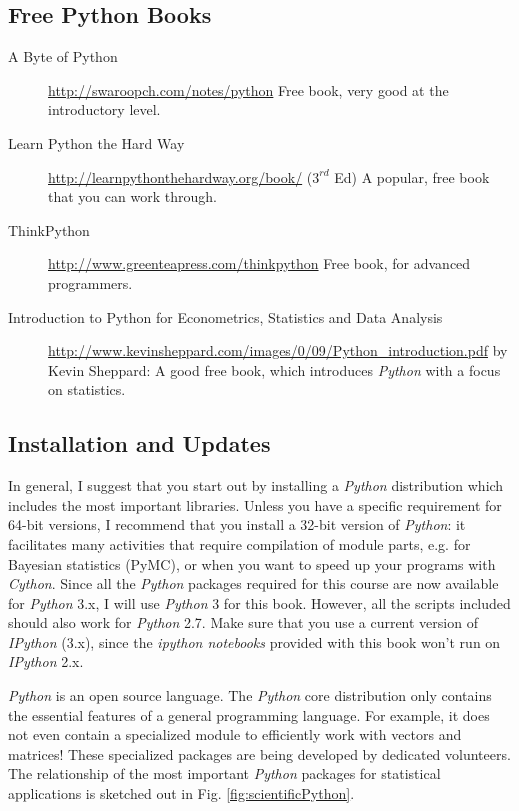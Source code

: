 \subsection{Free Python Books}

\begin{description}
  \item[A Byte of Python] \url{http://swaroopch.com/notes/python} Free book, very good at the introductory level.
  \item[Learn Python the Hard Way] \url{http://learnpythonthehardway.org/book/} ($3^{rd}$ Ed) A popular, free book that you can work through.
  \item[ThinkPython] \url{http://www.greenteapress.com/thinkpython} Free book, for advanced programmers.
  \item[Introduction to Python for Econometrics, Statistics and Data Analysis] \url{http://www.kevinsheppard.com/images/0/09/Python_introduction.pdf} by Kevin Sheppard: A
      good free book, which introduces \emph{Python} with a focus on statistics.
\end{description}

\subsection{Installation and Updates}

In general, I suggest that you start out by installing a \emph{Python} distribution which includes the most important libraries. Unless you have a specific requirement for 64-bit versions, I recommend that you install a 32-bit version of \emph{Python}: it facilitates many activities that require compilation of module parts, e.g. for Bayesian statistics (PyMC), or when you want to speed up your programs with \emph{Cython}. Since all the \emph{Python} packages required for this course are now available for \emph{Python} 3.x, I will use \emph{Python} 3 for this book. However, all the scripts included should also work for \emph{Python} 2.7. Make sure that you use a current version of \emph{IPython} (3.x), since the \emph{ipython notebooks} provided with this book won't run on \emph{IPython} 2.x.

\emph{Python} is an open source language. The \emph{Python} core distribution only contains the essential features of a general programming language. For example, it does not even contain a specialized module to efficiently work with vectors and matrices! These specialized packages are being developed by dedicated volunteers. The relationship of the most important \emph{Python} packages for statistical applications is sketched out in Fig. \ref{fig:scientificPython}.

